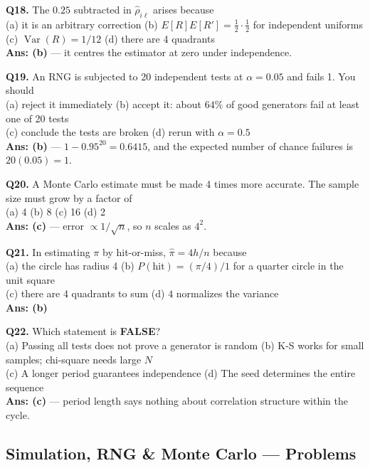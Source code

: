 \begin{mcqbox}
\textbf{Q18.} The $0.25$ subtracted in $\hat\rho_{i\ell}$ arises because\\
(a) it is an arbitrary correction \quad (b) $E[R]E[R'] = \frac12\cdot\frac12$ for independent uniforms\\
(c) $\operatorname{Var}(R) = 1/12$ \quad (d) there are 4 quadrants\\
\textbf{Ans: (b)} --- it centres the estimator at zero under independence.

\textbf{Q19.} An RNG is subjected to 20 independent tests at $\alpha = 0.05$ and fails 1. You should\\
(a) reject it immediately \quad (b) accept it: about $64\%$ of good generators fail at least one of 20 tests\\
(c) conclude the tests are broken \quad (d) rerun with $\alpha = 0.5$\\
\textbf{Ans: (b)} --- $1-0.95^{20} = 0.6415$, and the expected number of chance failures is $20(0.05) = 1$.

\textbf{Q20.} A Monte Carlo estimate must be made 4 times more accurate. The sample size must grow by a factor of\\
(a) 4 \quad (b) 8 \quad (c) 16 \quad (d) 2\\
\textbf{Ans: (c)} --- error $\propto 1/\sqrt n$, so $n$ scales as $4^2$.

\textbf{Q21.} In estimating $\pi$ by hit-or-miss, $\hat\pi = 4h/n$ because\\
(a) the circle has radius 4 \quad (b) $P(\text{hit}) = (\pi/4)/1$ for a quarter circle in the unit square\\
(c) there are 4 quadrants to sum \quad (d) $4$ normalizes the variance\\
\textbf{Ans: (b)}

\textbf{Q22.} Which statement is \textbf{FALSE}?\\
(a) Passing all tests does not prove a generator is random \quad (b) K-S works for small samples; chi-square needs large $N$\\
(c) A longer period guarantees independence \quad (d) The seed determines the entire sequence\\
\textbf{Ans: (c)} --- period length says nothing about correlation structure within the cycle.
\end{mcqbox}

\subsection{Simulation, RNG \& Monte Carlo --- Problems}

